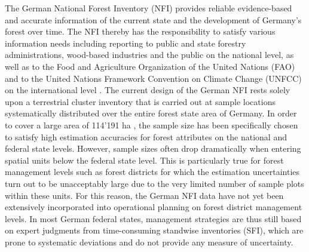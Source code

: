The German National Forest Inventory (NFI) provides reliable evidence-based and accurate information of the current state and the development of Germany's forest over time. The NFI thereby has the responsibility to satisfy various information needs including reporting to public and state forestry administrations, wood-based industries and the public on the national level, as well as to the Food and Agriculture Organization of the United Nations (FAO) and to the United Nations Framework Convention on Climate Change (UNFCC) on the international level \citep{polley2010intomppo}. The current design of the German NFI rests solely upon a terrestrial cluster inventory that is carried out at sample locations systematically distributed over the entire forest state area of Germany. In order to cover a large area of 114'191 ha \citep{bwi3}, the sample size has been specifically chosen to satisfy high estimation accuracies for forest attributes on the national and federal state levels. However, sample sizes often drop dramatically when entering spatial units below the federal state level. This is particularly true for forest management levels such as forest districts for which the estimation uncertainties turn out to be unacceptably large due to the very limited number of sample plots within these units. For this reason, the German NFI data have not yet been extensively incorporated into operational planning on forest district management levels. In most German federal states, management strategies are thus still based on expert judgments from time-consuming standwise inventories (SFI), which are prone to systematic deviations \cite{kulievsis2016} and do not provide any measure of uncertainty.\par

